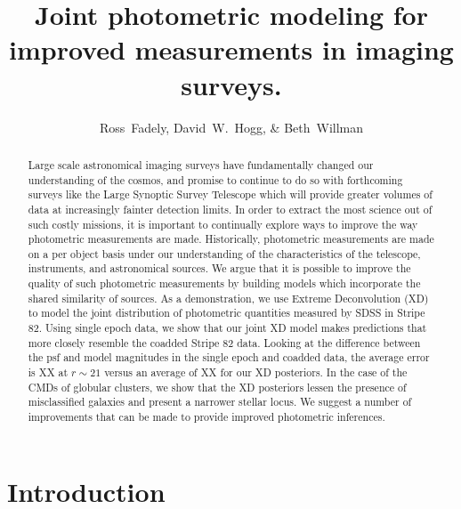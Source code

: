 \documentclass[12pt,preprint]{aastex}
\begin{document}
\title{Joint photometric modeling for improved measurements in imaging surveys.}
\author{Ross~Fadely,
        David~W.~Hogg,
        \& Beth~Willman}


%
%
\begin{abstract}
Large scale astronomical imaging surveys have fundamentally changed our 
understanding of the cosmos, and promise to continue to do so with 
forthcoming surveys like the Large Synoptic Survey Telescope which will 
provide greater volumes of data at increasingly fainter detection limits.  
In order to extract the most science out of such costly missions, it is 
important to continually explore ways to improve the way photometric 
measurements are made.  Historically, photometric measurements are made 
on a per object basis under our understanding of the characteristics of 
the telescope, instruments, and astronomical sources.  We argue that it 
is possible to improve the quality of such photometric measurements by 
building models which incorporate the shared similarity of sources.  As 
a demonstration, we use Extreme Deconvolution (XD) to model the joint 
distribution of photometric quantities measured by SDSS in Stripe 82.  
Using single epoch data, we show that our joint XD model makes predictions 
that more closely resemble the coadded Stripe 82 data.  Looking at the 
difference between the psf and model magnitudes in the single epoch and 
coadded data, the average error is XX at $r\sim21$ versus an average of 
XX for our XD posteriors.  In the case of the CMDs of globular clusters, 
we show that the XD posteriors lessen the presence of misclassified 
galaxies and present a narrower stellar locus.  We suggest a number of 
improvements that can be made to provide improved photometric inferences.
\end{abstract}

%
%
\section{Introduction}
\end{document}
